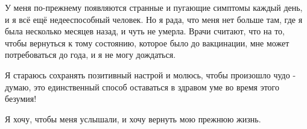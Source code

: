У меня по-прежнему появляются странные и пугающие симптомы каждый день, и я всё
ещё недееспособный человек. Но я рада, что меня нет больше там, где я была
несколько месяцев назад, и чуть не умерла. Врачи считают, что на то, чтобы
вернуться к тому состоянию, которое было до вакцинации, мне может потребоваться
до года, и я не могу дождаться.

Я стараюсь сохранять позитивный настрой и молюсь, чтобы произошло чудо - думаю,
это единственный способ оставаться в здравом уме во время этого безумия!

Я хочу, чтобы меня услышали, и хочу вернуть мою прежнюю жизнь.
